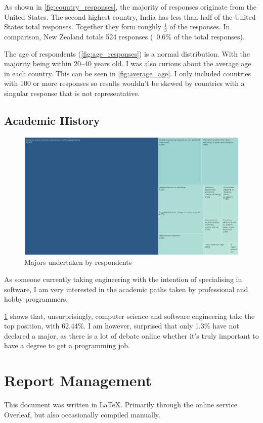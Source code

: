 \documentclass{scrartcl}
\begin{document}
As shown in \autoref{fig:country_responses}, the majority of responses originate from the United States. The second highest country, India has less than half of the United States total responses. Together they form roughly \(\frac{1}{3}\) of the responses. In comparison, New Zealand totals \num{524} responses (~0.6\% of the total responses).

The age of respondents (\autoref{fig:age_responses}) is a normal distribution. With the majority being within \numrange{20}{40} years old. I was also curious about the average age in each country. This can be seen in \autoref{fig:average_age}. I only included countries with 100 or more responses so results wouldn't be skewed by countries with a singular response that is not representative.

\subsection{Academic History}
\begin{figure}[p]
    \centering
    \includegraphics[width=\linewidth]{Documentation/images/majors.png}
    \caption{Majors undertaken by respondents}
    \label{fig:majors}
\end{figure}
As someone currently taking engineering with the intention of specialising in software, I am very interested in the academic paths taken by professional and hobby programmers.

\ref{fig:majors} shows that, unsurprisingly, computer science and software engineering take the top position, with 62.44\%. I am however, surprised that only 1.3\% have not declared a major, as there is a lot of debate online whether it's truly important to have a degree to get a programming job.


\section{Report Management}
This document was written in \LaTeX. Primarily through the online service Overleaf, but also occasionally compiled manually.
\end{document}
